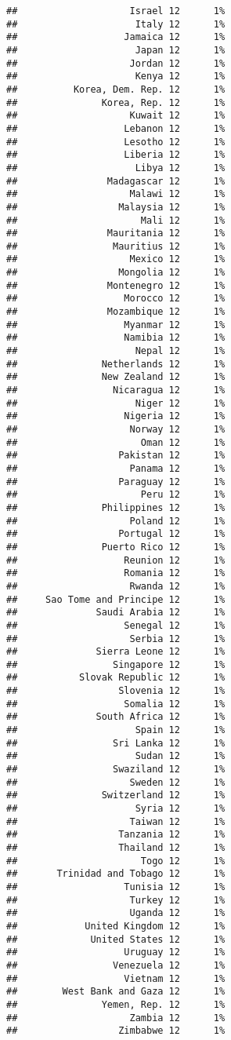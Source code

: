 \documentclass[
]{book}
\begin{document}
\begin{verbatim}
##                    Israel 12      1%
##                     Italy 12      1%
##                   Jamaica 12      1%
##                     Japan 12      1%
##                    Jordan 12      1%
##                     Kenya 12      1%
##          Korea, Dem. Rep. 12      1%
##               Korea, Rep. 12      1%
##                    Kuwait 12      1%
##                   Lebanon 12      1%
##                   Lesotho 12      1%
##                   Liberia 12      1%
##                     Libya 12      1%
##                Madagascar 12      1%
##                    Malawi 12      1%
##                  Malaysia 12      1%
##                      Mali 12      1%
##                Mauritania 12      1%
##                 Mauritius 12      1%
##                    Mexico 12      1%
##                  Mongolia 12      1%
##                Montenegro 12      1%
##                   Morocco 12      1%
##                Mozambique 12      1%
##                   Myanmar 12      1%
##                   Namibia 12      1%
##                     Nepal 12      1%
##               Netherlands 12      1%
##               New Zealand 12      1%
##                 Nicaragua 12      1%
##                     Niger 12      1%
##                   Nigeria 12      1%
##                    Norway 12      1%
##                      Oman 12      1%
##                  Pakistan 12      1%
##                    Panama 12      1%
##                  Paraguay 12      1%
##                      Peru 12      1%
##               Philippines 12      1%
##                    Poland 12      1%
##                  Portugal 12      1%
##               Puerto Rico 12      1%
##                   Reunion 12      1%
##                   Romania 12      1%
##                    Rwanda 12      1%
##     Sao Tome and Principe 12      1%
##              Saudi Arabia 12      1%
##                   Senegal 12      1%
##                    Serbia 12      1%
##              Sierra Leone 12      1%
##                 Singapore 12      1%
##           Slovak Republic 12      1%
##                  Slovenia 12      1%
##                   Somalia 12      1%
##              South Africa 12      1%
##                     Spain 12      1%
##                 Sri Lanka 12      1%
##                     Sudan 12      1%
##                 Swaziland 12      1%
##                    Sweden 12      1%
##               Switzerland 12      1%
##                     Syria 12      1%
##                    Taiwan 12      1%
##                  Tanzania 12      1%
##                  Thailand 12      1%
##                      Togo 12      1%
##       Trinidad and Tobago 12      1%
##                   Tunisia 12      1%
##                    Turkey 12      1%
##                    Uganda 12      1%
##            United Kingdom 12      1%
##             United States 12      1%
##                   Uruguay 12      1%
##                 Venezuela 12      1%
##                   Vietnam 12      1%
##        West Bank and Gaza 12      1%
##               Yemen, Rep. 12      1%
##                    Zambia 12      1%
##                  Zimbabwe 12      1%
\end{verbatim}
\end{document}
